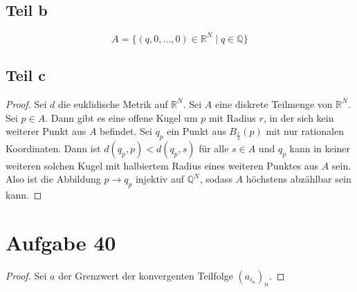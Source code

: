 \documentclass[10pt,a4paper]{article}
\begin{document}
\subsection{Teil b}
\begin{equation}
  A = \{ (q, 0, \dots, 0) \in \mathbb{R}^{N} \mid q \in \mathbb{Q} \}
\end{equation}

\subsection{Teil c}
\begin{proof}
  Sei $d$ die euklidische Metrik auf $\mathbb{R}^N$.
  Sei $A$ eine diskrete Teilmenge von $\mathbb{R}^{N}$.
  Sei $p \in A$.
  Dann gibt es eine offene Kugel um $p$ mit Radius $r$, in der sich kein weiterer Punkt aus $A$ befindet.
  Sei $q_{p}$ ein Punkt aus $B_{\frac{r}{2}}(p)$ mit nur rationalen Koordinaten.
  Dann ist $d(q_{p}, p) < d(q_{p}, s)$ für alle $s \in A$ und $q_{p}$ kann in keiner weiteren solchen Kugel mit halbiertem Radius eines weiteren Punktes aus $A$ sein.
  Also ist die Abbildung $p \rightarrow q_{p}$ injektiv auf $\mathbb{Q}^{N}$, sodass $A$ höchstens abzählbar sein kann.
\end{proof}

\section{Aufgabe 40}
\begin{proof}
  Sei $a$ der Grenzwert der konvergenten Teilfolge $(a_{i_{n}})_{n}$.

\end{proof}
\end{document}

